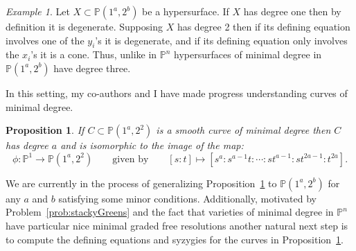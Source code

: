 \documentclass[11pt,reqno]{amsart}
\newtheorem{prop}[lemma]{Proposition}
\theoremstyle{remark}
\newtheorem{example}[lemma]{Example}
\renewcommand{\P}{\mathbb{P}}
\begin{document}
\begin{example}
Let $X\subset \P(1^a,2^b)$ be a hypersurface. If $X$ has degree one then by definition it is degenerate. Supposing $X$ has degree 2 then if its defining equation involves one of the $y_{i}$'s it is degenerate, and if its defining equation only involves the $x_{i}$'s it is a cone. Thus, unlike in $\P^{n}$ hypersurfaces of minimal degree in $\P(1^a,2^b)$ have degree three. 
\end{example}


In this setting, my co-authors and I have made progress understanding curves of minimal degree. 


\begin{prop}\label{prop:ongoing-curves-min-deg}
	If $C \subset \P(1^{a},2^2)$ is a smooth curve of minimal degree then $C$ has degree $a$ and is isomorphic to the image of the map: 
	\[
	\phi:\P^{1}\to \P(1^{a},2^{2}) \quad \quad \text{given by} \quad \quad [s:t]\mapsto [s^a: s^{a-1}t: \cdots : st^{a-1}: st^{2a-1} : t^{2a}].
	\] 
\end{prop}


We are currently in the process of generalizing Proposition~\ref{prop:ongoing-curves-min-deg} to $\P(1^a,2^b)$ for any $a$ and $b$ satisfying some minor conditions. Additionally, motivated by Problem~\ref{prob:stackyGreens} and the fact that varieties of minimal degree in $\P^{n}$ have particular nice minimal graded free resolutions another natural next step is to compute the defining equations and syzygies for the curves in Proposition~\ref{prop:ongoing-curves-min-deg}.


\end{document}
